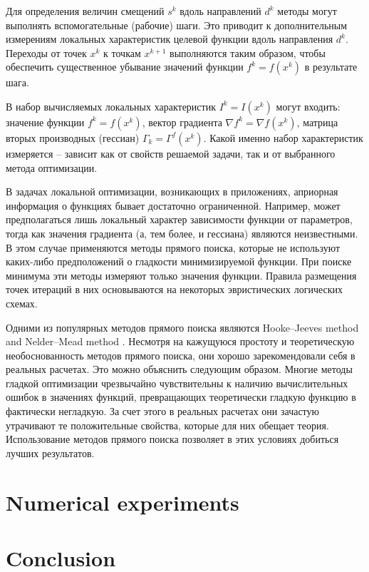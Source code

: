 \documentclass{svproc}
\begin{document}
Для определения величин смещений $s^k$ вдоль направлений $d^k$ методы могут выполнять вспомогательные (рабочие) шаги. Это приводит к дополнительным измерениям локальных характеристик целевой функции вдоль направления $d^k$. Переходы от точек $x^k$ к точкам $x^{k+1}$ выполняются таким образом, чтобы обеспечить существенное убывание значений функции $f^k = f( x^k )$ в результате шага.

В набор вычисляемых локальных характеристик $I^k=I(x^k)$ могут входить: значение функции $f^k = f( x^k )$, вектор градиента $\nabla f^k = \nabla f(x^k)$, матрица вторых производных (гессиан) $\Gamma_k=\Gamma^f(x^k)$. Какой именно набор характеристик измеряется -- зависит как от свойств решаемой задачи, так и от выбранного метода оптимизации.

В задачах локальной оптимизации, возникающих в приложениях, априорная информация о функциях бывает достаточно ограниченной. Например, может предполагаться лишь локальный характер зависимости функции от параметров, тогда как значения градиента (а, тем более, и гессиана) являются неизвестными. В этом случае применяются методы прямого поиска, которые не используют каких-либо предположений о гладкости минимизируемой функции. При поиске минимума эти методы измеряют только значения функции. Правила размещения точек итераций в них основываются на некоторых эвристических логических схемах. 

Одними из популярных методов прямого поиска являются Hooke--Jeeves method \cite{HookJeeves} and Nelder--Mead method \cite{NelderMead}. Несмотря на кажущуюся простоту и теоретическую необоснованность методов прямого поиска, они хорошо зарекомендовали себя в реальных расчетах. Это можно объяснить следующим образом. Многие методы гладкой оптимизации чрезвычайно чувствительны к наличию вычислительных ошибок в значениях функций, превращающих теоретически гладкую функцию в фактически негладкую. За счет этого в реальных расчетах они зачастую утрачивают те положительные свойства, которые для них обещает теория. Использование методов прямого поиска позволяет в этих условиях добиться лучших результатов.







\section{Numerical experiments}


\section{Conclusion}

%
%

{}
\end{document}
